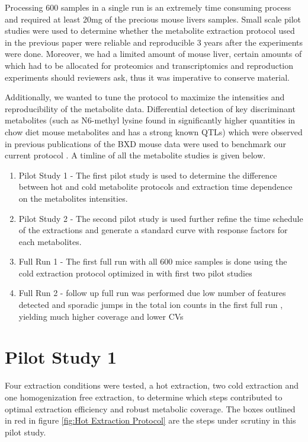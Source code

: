 \documentclass[a4paper]{book}
\begin{document}
	Processing 600 samples in a single run is an extremely time consuming process and required at least 20\si{\milli\gram} of the precious mouse livers samples. Small scale pilot studies were used to determine whether the metabolite extraction protocol used in the previous paper\citep{Williams2016SystemsFunction} were reliable and reproducible 3 years after the experiments were done. Moreover, we had a limited amount of mouse liver, certain amounts of which had to be allocated for proteomics and transcriptomics and reproduction experiments should reviewers ask, thus it was imperative to conserve material. 
	
	Additionally, we wanted to tune the protocol to maximize the intensities and reproducibility of the metabolite data. Differential detection of key discriminant metabolites (such as N6-methyl lysine found in significantly higher quantities in chow diet mouse metabolites and has a strong known QTLs) which were observed in previous publications of the BXD mouse data were used to benchmark our current protocol \citep{Williams2016SystemsFunction,Wu2014MultilayeredPopulation}.  A timline of all the metabolite studies is given below.
	
	\begin{enumerate}
		\item Pilot Study 1 - The first pilot study is used to determine the difference between hot and cold metabolite protocols and extraction time dependence on the metabolites intensities.
		\item Pilot Study 2 - The second pilot study is used further refine the time schedule of the extractions and generate a standard curve with response factors for each metabolites. 
		\item Full Run 1 - The first full run with all 600 mice samples is done using the cold extraction protocol optimized in with first two pilot studies 
		\item Full Run 2 - follow up full run was performed due low number of features detected and sporadic jumps in the total ion counts in the first full run , yielding much higher coverage and lower CVs 
	\end{enumerate}
	
	\section{Pilot Study 1}
	
	Four extraction conditions were tested, a hot extraction, two cold extraction and one homogenization free extraction, to determine which steps contributed to optimal extraction efficiency and robust metabolic coverage. The boxes outlined in red in figure \ref{fig:Hot Extraction Protocol} are the steps under scrutiny in this pilot study.
		
\end{document}
